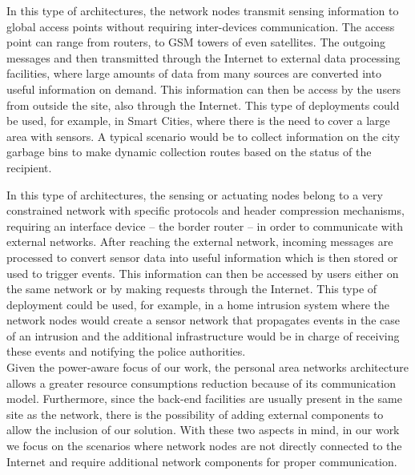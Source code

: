 In this type of architectures, the network nodes transmit sensing information to global access points without requiring inter-devices communication. The access point can range from routers, to GSM towers of even satellites. The outgoing messages and then transmitted through the Internet to external data processing facilities, where large amounts of data from many sources are converted into useful information on demand. This information can then be access by the users from outside the site, also through the Internet.
This type of deployments could be used, for example, in Smart Cities, where there is the need to cover a large area with sensors. A typical scenario would be to collect information on the city garbage bins to make dynamic collection routes based on the status of the recipient.
  


In this type of architectures, the sensing or actuating nodes belong to a very constrained network with specific protocols and header compression mechanisms, requiring an interface device -- the border router -- in order to communicate with external networks.
After reaching the external network, incoming messages are processed to convert sensor data into useful information which is then stored or used to trigger events. 
This information can then be accessed by users either on the same network or by making requests through the Internet. 
This type of deployment could be used, for example, in a home intrusion system where the network nodes would create a sensor network that propagates events in the case of an intrusion and the additional infrastructure would be in charge of receiving these events and notifying the police authorities.\\
 
Given the power-aware focus of our work, the personal area networks architecture allows a greater resource consumptions reduction because of its communication model. Furthermore, since the back-end facilities are usually present in the same site as the network, there is the possibility of adding external components to allow the inclusion of our solution. With these two aspects in mind, in our work we focus on the scenarios where network nodes are not directly connected to the Internet and require additional network components for proper communication.